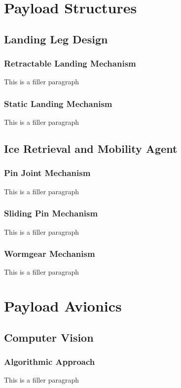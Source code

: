 \section{Payload Structures}\label{PL:Deployment:Structures}
	\subsection{Landing Leg Design}
		\subsubsection{Retractable Landing Mechanism}
			This is a filler paragraph

		\subsubsection{Static Landing Mechanism}
			This is a filler paragraph

	\subsection{Ice Retrieval and Mobility Agent}
		\subsubsection{Pin Joint Mechanism}
			This is a filler paragraph

		\subsubsection{Sliding Pin Mechanism}
			This is a filler paragraph

		\subsubsection{Wormgear Mechanism}
			This is a filler paragraph

\section{Payload Avionics}\label{PL:Deployment:Avionics}
	\subsection{Computer Vision}
		\subsubsection{Algorithmic Approach}
			This is a filler paragraph


